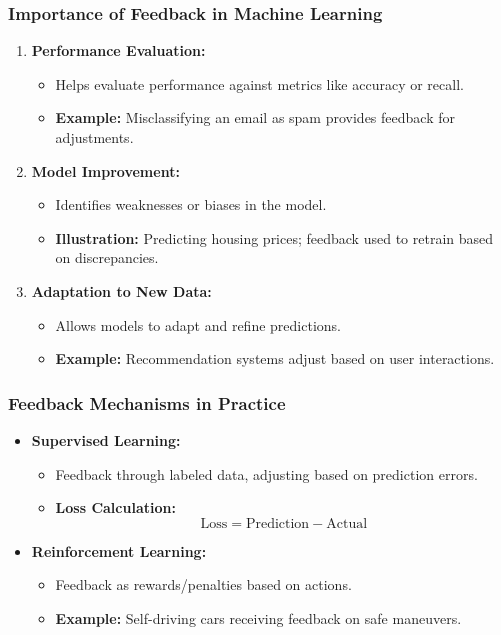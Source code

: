 \documentclass{beamer}
\begin{document}
\begin{frame}[fragile]
    \frametitle{Importance of Feedback in Machine Learning}
    \begin{enumerate}
        \item \textbf{Performance Evaluation:}
        \begin{itemize}
            \item Helps evaluate performance against metrics like accuracy or recall.
            \item \textbf{Example:} Misclassifying an email as spam provides feedback for adjustments.
        \end{itemize}
        
        \item \textbf{Model Improvement:}
        \begin{itemize}
            \item Identifies weaknesses or biases in the model.
            \item \textbf{Illustration:} Predicting housing prices; feedback used to retrain based on discrepancies.
        \end{itemize}
        
        \item \textbf{Adaptation to New Data:}
        \begin{itemize}
            \item Allows models to adapt and refine predictions.
            \item \textbf{Example:} Recommendation systems adjust based on user interactions.
        \end{itemize}
    \end{enumerate}
\end{frame}

\begin{frame}[fragile]
    \frametitle{Feedback Mechanisms in Practice}
    \begin{itemize}
        \item \textbf{Supervised Learning:}
        \begin{itemize}
            \item Feedback through labeled data, adjusting based on prediction errors.
            \item \textbf{Loss Calculation:}
            \begin{equation}
                \text{Loss} = \text{Prediction} - \text{Actual}
            \end{equation}
        \end{itemize}
        
        \item \textbf{Reinforcement Learning:}
        \begin{itemize}
            \item Feedback as rewards/penalties based on actions.
            \item \textbf{Example:} Self-driving cars receiving feedback on safe maneuvers.
        \end{itemize}
    \end{itemize}
\end{frame}
\end{document}

